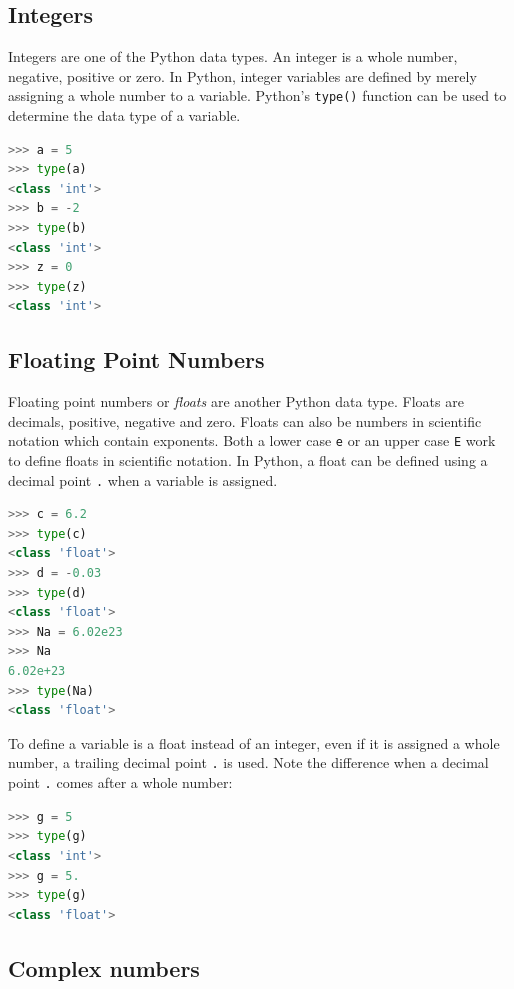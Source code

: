 \documentclass{book}
\begin{document}
    
        \subsection{Integers}\label{integers}

Integers are one of the Python data types. An integer is a whole number,
negative, positive or zero. In Python, integer variables are defined by
merely assigning a whole number to a variable. Python's
\lstinline!type()! function can be used to determine the data type of a
variable.

\begin{lstlisting}[language=Python]
>>> a = 5
>>> type(a)
<class 'int'>
>>> b = -2
>>> type(b)
<class 'int'>
>>> z = 0
>>> type(z)
<class 'int'>
\end{lstlisting}
    




    
        \subsection{Floating Point Numbers}\label{floating-point-numbers}

Floating point numbers or \emph{floats} are another Python data type.
Floats are decimals, positive, negative and zero. Floats can also be
numbers in scientific notation which contain exponents. Both a lower
case \lstinline!e! or an upper case \lstinline!E! work to define floats
in scientific notation. In Python, a float can be defined using a
decimal point \lstinline!.! when a variable is assigned.

\begin{lstlisting}[language=Python]
>>> c = 6.2
>>> type(c)
<class 'float'>
>>> d = -0.03
>>> type(d)
<class 'float'>
>>> Na = 6.02e23
>>> Na
6.02e+23
>>> type(Na)
<class 'float'>
\end{lstlisting}

To define a variable is a float instead of an integer, even if it is
assigned a whole number, a trailing decimal point \lstinline!.! is used.
Note the difference when a decimal point \lstinline!.! comes after a
whole number:

\begin{lstlisting}[language=Python]
>>> g = 5
>>> type(g)
<class 'int'>
>>> g = 5.
>>> type(g)
<class 'float'>
\end{lstlisting}
    




    
        \subsection{Complex numbers}\label{complex-numbers}
\end{document}
